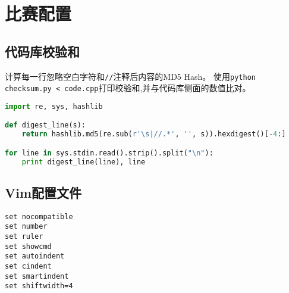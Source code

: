 \section{比赛配置}
\subsection{代码库校验和}
\begin{mdframed}[hidealllines=true,backgroundcolor=blue!5]
计算每一行忽略空白字符和\texttt{//}注释后内容的MD5 Hash。
使用\texttt{python checksum.py < code.cpp}打印校验和,并与代码库侧面的数值比对。
\end{mdframed}\vspace{-10pt}
\begin{lstlisting}[language=Python]
import re, sys, hashlib

def digest_line(s):
    return hashlib.md5(re.sub(r'\s|//.*', '', s)).hexdigest()[-4:]

for line in sys.stdin.read().strip().split("\n"):
    print digest_line(line), line

\end{lstlisting}
\subsection{Vim配置文件}
\begin{lstlisting}[language={}]
set nocompatible
set number
set ruler
set showcmd
set autoindent
set cindent
set smartindent
set shiftwidth=4

\end{lstlisting}
